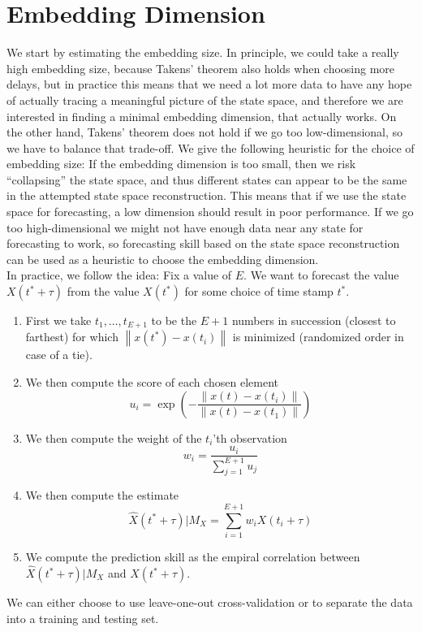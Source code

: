 \documentclass[11pt, a4paper]{memoir}
\theoremstyle{break}
\theoremstyle{break}
\theoremstyle{nonumberplain}
\newcommand{\norm}[1]{\left\lVert#1\right\rVert}
\begin{document}
\section{Embedding Dimension}
We start by estimating the embedding size. In principle, we could take a really high embedding size, because Takens' theorem also holds when choosing more delays, but in practice this means that we need a lot more data to have any hope of actually tracing a meaningful picture of the state space, and therefore we are interested in finding a minimal embedding dimension, that actually works. On the other hand, Takens' theorem does not hold if we go too low-dimensional, so we have to balance that trade-off. We give the following heuristic for the choice of embedding size: If the embedding dimension is too small, then we risk \enquote{collapsing} the state space, and thus different states can appear to be the same in the attempted state space reconstruction. This means that if we use the state space for forecasting, a low dimension should result in poor performance. If we go too high-dimensional we might not have enough data near any state for forecasting to work, so forecasting skill based on the state space reconstruction can be used as a heuristic to choose the embedding dimension.\\[5pt]
In practice, we follow the idea: Fix a value of $E$. We want to forecast the value $X(t^*+\tau)$ from the value $X(t^*)$ for some choice of time stamp $t^*$.
\begin{enumerate}[label=(\roman*)]
	\item First we take $t_1,\ldots,t_{E+1}$ to be the $E+1$ numbers in succession (closest to farthest) for which $\norm{x(t^*)-x(t_{i})}$ is minimized (randomized order in case of a tie).
	\item We then compute the score of each chosen element
	$$u_i=\exp\left(-\frac{\norm{x(t)-x(t_i)}}{\norm{x(t)-x(t_1)}}\right)$$
	\item We then compute the weight of the $t_i$'th observation
	$$w_i=\frac{u_i}{\sum_{j=1}^{E+1} u_j}$$
	\item We then compute the estimate
	$$\hat{X}(t^*+\tau)|M_X=\sum_{i=1}^{E+1} w_i X(t_i+\tau)$$
	\item We compute the prediction skill as the empiral correlation between $\hat{X}(t^*+\tau)|M_X$ and $X(t^*+\tau)$.
\end{enumerate}
We can either choose to use leave-one-out cross-validation or to separate the data into a training and testing set.\\
\end{document}
